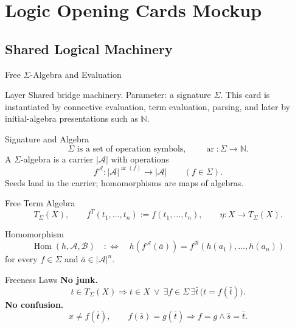 \documentclass[12pt, a4paper]{report}
\begin{document}
\ExplSyntaxOff
\renewcommand{\familydefault}{\rmdefault}

\chapter*{Logic Opening Cards Mockup}

\section*{Shared Logical Machinery}

\begin{modelbox}{Free \(\Sigma\)-Algebra and Evaluation}

\begin{modelcomponent}{Layer}
Shared bridge machinery. Parameter: a signature \(\Sigma\). This card is
instantiated by connective evaluation, term evaluation, parsing, and later by
initial-algebra presentations such as \(\mathbb N\).
\end{modelcomponent}

\begin{modelcomponent}{Signature and Algebra}
\[
  \Sigma\text{ is a set of operation symbols},
  \qquad
  \operatorname{ar}:\Sigma\to\mathbb N.
\]
A \(\Sigma\)-algebra is a carrier \(\lvert\mathcal A\rvert\) with operations
\[
  f^{\mathcal A}:\lvert\mathcal A\rvert^{\operatorname{ar}(f)}
  \to \lvert\mathcal A\rvert
  \qquad(f\in\Sigma).
\]
Seeds land in the carrier; homomorphisms are maps of algebras.
\end{modelcomponent}

\begin{modelcomponent}{Free Term Algebra}
\[
  T_{\Sigma}(X),
  \qquad
  f^{T}(t_1,\ldots,t_n):=f(t_1,\ldots,t_n),
  \qquad
  \eta:X\to T_{\Sigma}(X).
\]
\end{modelcomponent}

\begin{modelcomponent}{Homomorphism}
\[
  \operatorname{Hom}(h,\mathcal A,\mathcal B)
  \quad:\Longleftrightarrow\quad
  h(f^{\mathcal A}(\bar a))
  =
  f^{\mathcal B}(h(a_1),\ldots,h(a_n))
\]
for every \(f\in\Sigma\) and \(\bar a\in\lvert\mathcal A\rvert^n\).
\end{modelcomponent}

\begin{modelcomponent}{Freeness Laws}
\textbf{No junk.}
\[
  t\in T_{\Sigma}(X)
  \Longrightarrow
  t\in X\ \vee\
  \exists f\in\Sigma\,\exists\bar t\,\bigl(t=f(\bar t)\bigr).
\]
\textbf{No confusion.}
\[
  x\neq f(\bar t),
  \qquad
  f(\bar s)=g(\bar t)\Longrightarrow f=g\wedge \bar s=\bar t.
\]
\end{modelcomponent}


\end{modelbox}
\end{document}
